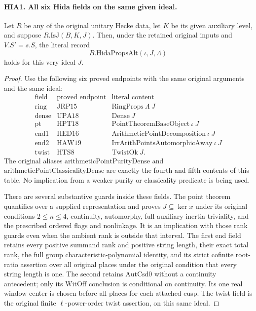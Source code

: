 \documentclass[11pt,a4paper]{article}
\numberwithin{equation}{section}
\theoremstyle{remark}\newtheorem{remark}[theorem]{Remark}
\begin{document}
\paragraph{HIA1. All six Hida fields on the same given ideal.}
\label{claim:HIA1}
Let \(R\) be any of the original unitary Hecke data, let \(K\)
be its given auxiliary level, and suppose
\(R.\mathrm{IsJ}(B,K,J)\).  Then, under the retained original
inputs and \(V.S'=s.S\), the literal record
\[
                         B.\mathrm{HidaPropsAlt}(\iota,J,\Lambda)
                         \tag{HIA.1}
\]
holds for this very ideal \(J\).
\begin{proof}
Use the following six proved endpoints with the same original
arguments and the same ideal:
\[
\begin{array}{c|c|l}
\text{field}&\text{proved endpoint}&\text{literal content}\\ \hline
\mathrm{ring}&\mathrm{JRP15}&\mathrm{RingProps}\ \Lambda\ J\\
\mathrm{dense}&\mathrm{UPA18}&\mathrm{Dense}\ J\\
\mathrm{pt}&\mathrm{HPT18}&\mathrm{PointTheoremBaseObject}\ \iota\ J\\
\mathrm{end1}&\mathrm{HED16}&\mathrm{ArithmeticPointDecomposition}\ \iota\ J\\
\mathrm{end2}&\mathrm{HAW19}&\mathrm{IrrArithPointsAutomorphicAway}\ \iota\ J\\
\mathrm{twist}&\mathrm{HTS8}&\mathrm{TwistOk}\ J.
\end{array}
\tag{HIA.2}
\]
The original aliases \(\mathrm{arithmeticPointPurityDense}\)
and \(\mathrm{arithmeticPointClassicalityDense}\) are exactly
the fourth and fifth contents of this table.  No implication
from a weaker purity or classicality predicate is being used.

There are several substantive guards inside these fields.
The point theorem quantifies over a supplied representation
and proves \(J\subseteq\ker x\) under its original conditions
\(2\leq n\leq4\), continuity, automorphy, full auxiliary
inertia triviality, and the prescribed ordered flags and
nonlinkage.  It is an implication with those rank guards even
when the ambient rank is outside that interval.  The first
end field retains every positive summand rank and positive
string length, their exact total rank, the full group
characteristic-polynomial identity, and its strict cofinite
root-ratio assertion over all original places under the original
condition that every string length is one.  The second
retains \(\mathrm{AutCsd0}\) without a continuity antecedent;
only its \(\mathrm{WitOff}\) conclusion is conditional on
continuity.  Its one real window center is chosen before all
places for each attached cusp.  The twist field is the
original finite \(\ell\)-power-order twist assertion, on this same ideal.


\end{proof}
\end{document}
